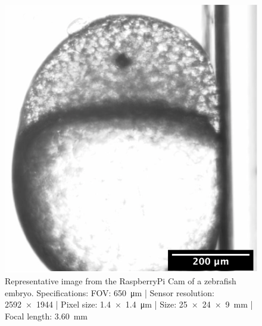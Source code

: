 \begin{figure}
  \centering
  \includegraphics[width=0.4\linewidth]{./fish_in_pi_scale}
  \caption{Representative image from the RaspberryPi Cam of a \gls{zebrafish} embryo.
  Specifications:
  \gls{FOV}: \SI{650}{\micro\meter} |
  Sensor resolution: \SI{2592x1944}{} |
  Pixel size: \SI{1.4x1.4}{\micro\meter} |
  Size: \SI{25x24x9}{\milli\meter} |
  Focal length: \SI{3.60}{\milli\meter}
  }\label{fig:fish_in_pi_scale}
\end{figure}

